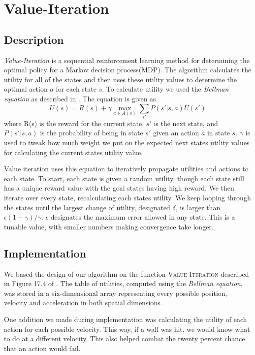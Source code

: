 \documentclass{article}
\begin{document}
	\section{Value-Iteration}
	\subsection{Description}
	\textit{Value-Iteration} is a sequential reinforcement learning method for determining the optimal policy for a Markov decision process(MDP)\cite{Yu2013}. The algorithm calculates the utility for all of the states and then uses these utility values to determine the optimal action $a$ for each state $s$. To calculate utility we used the \textit{Bellman equation} as described in \cite{ai}. The equation is given as			
	\begin{equation}
	U(s) = R(s) + \gamma \max_{a \in A(s)}\sum_{s'} P(s'|s,a)U(s')
	\end{equation}
	where R(s) is the reward for the current state, $s'$ is the next state, and $P(s'|s,a)$ is the probability of being in state $s'$ given an action $a$ in state $s$. $\gamma$ is used to tweak how much weight we put on the expected next states utility values for calculating the current states utility value.
	
	Value iteration uses this equation to iteratively propagate utilities and actions to each state. To start, each state is given a random utility, though each state still has a unique reward value with the goal states having high reward. We then iterate over every state, recalculating each states utility. We keep looping through the states until the largest change of utility, designated $\delta$, is larger than $\epsilon(1-\gamma)/\gamma$. $\epsilon$ designates the maximum error allowed in any state. This is a tunable value, with smaller numbers making convergence take longer.
	\subsection{Implementation}
	
	We based the design of our algorithm on the function \textsc{Value-Iteration} described in Figure 17.4 of \cite{ai}. 
	The table of utilities, computed using the \textit{Bellman equation}, was stored in a six-dimensional array representing every possible position, velocity and acceleration in both spatial dimensions.
	
	One addition we made during implementation was calculating the utility of each action for each possible velocity. This way, if a wall was hit, we would know what to do at a different velocity. This also helped combat the twenty percent chance that an action would fail.
	
\end{document}

